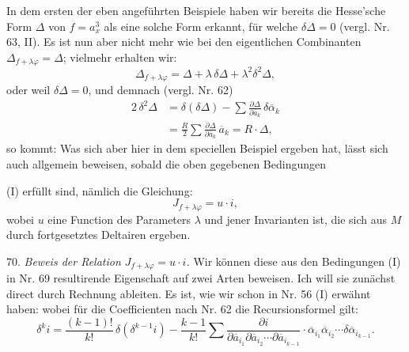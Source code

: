 In dem ersten der eben angeführten Beispiele haben wir bereits die Hesse'sche Form $\varDelta$ von $f=a_x^3$ als eine solche Form erkannt, für welche $\delta\varDelta=0$ (vergl. Nr. 63, II). Es ist nun aber nicht mehr wie bei den eigentlichen Combinanten $\varDelta_{f+\lambda\varphi}=\varDelta$; vielmehr erhalten wir:
\[
\varDelta_{f+\lambda\varphi} = \varDelta + \lambda\,\delta\varDelta + \lambda^2\delta^2\varDelta,
\]
oder weil $\delta\varDelta=0$, und demnach (vergl. Nr. 62)
\[
\begin{aligned}
2\,\delta^2\varDelta &= \delta(\delta\varDelta) - \sum \frac{\partial\varDelta}{\partial\overline a_k}\,\delta\overline\alpha_k\\
&= \frac{R}{2}\sum \frac{\partial\varDelta}{\partial\overline a_k}\,\overline a_k = R\cdot\varDelta,
\end{aligned}
\]
so kommt:
Was sich aber hier in dem speciellen Beispiel ergeben hat, lässt sich auch allgemein beweisen, sobald die oben gegebenen Bedingungen


(I) erfüllt sind, nämlich die Gleichung:
\[
J_{f+\lambda\varphi} = u\cdot i,
\]
wobei $u$ eine Function des Parameters $\lambda$ und jener Invarianten ist, die sich aus $M$ durch fortgesetztes Deltairen ergeben.

70. \textit{Beweis der Relation $J_{f+\lambda\varphi}=u\cdot i$.} Wir können diese aus den Bedingungen (I) in Nr. 69 resultirende Eigenschaft auf zwei Arten beweisen. Ich will sie zunächst direct durch Rechnung ableiten. Es ist, wie wir schon in Nr. 56 (I) erwähnt haben:
wobei für die Coefficienten nach Nr. 62 die Recursionsformel gilt:
\[
\delta^k i = \frac{(k-1)!}{k!}\,\delta(\delta^{k-1}i) - \frac{k-1}{k!}\sum \frac{\partial i}{\partial\overline a_{i_1}\partial\overline a_{i_2}\cdots\partial\overline a_{i_{k-1}}}\cdot \overline\alpha_{i_1}\overline\alpha_{i_2}\cdots \delta\overline\alpha_{i_{k-1}}.
\]

